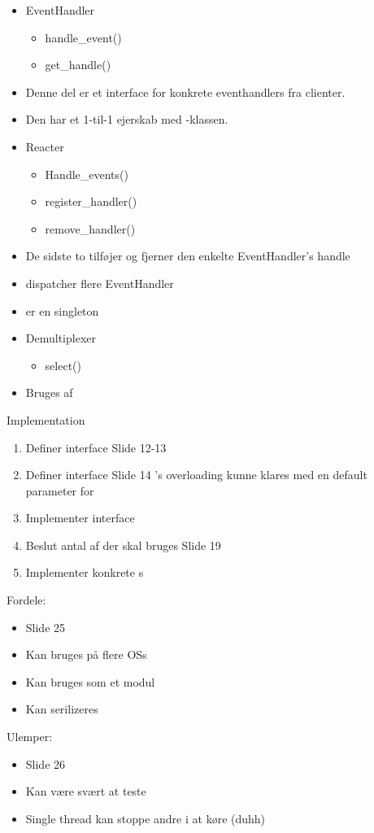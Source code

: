 \documentclass[oneside, 10pt]{memoir}
\begin{document}
\begin{itemize}
\item EventHandler
	\begin{itemize}
	\item handle\_event()
	\item get\_handle()
	\end{itemize}
\item[] Denne del er et interface for konkrete eventhandlers fra clienter.
\item[] Den har et 1-til-1 ejerskab med -klassen.

\item Reacter
	\begin{itemize}
	\item Handle\_events()
	\item register\_handler()
	\item remove\_handler()
	\end{itemize}
\item[] De sidste to tilføjer og fjerner den enkelte EventHandler's handle
\item[]  dispatcher flere EventHandler
\item[]  er en singleton

\item Demultiplexer
	\begin{itemize}
	\item select()
	\end{itemize}
\item[] Bruges af 
\end{itemize}
Implementation
\begin{enumerate}
\item Definer  interface
\subitem Slide 12-13
\item Definer  interface
\subitem Slide 14
\subitem {}'s overloading kunne klares med en default parameter for 
\item Implementer  interface
\item Beslut antal af  der skal bruges
\subitem Slide 19
\item Implementer konkrete s
\end{enumerate}
Fordele:

\begin{itemize}
\item Slide 25
\item Kan bruges på flere OSs
\item Kan bruges som et modul
\item Kan serilizeres
\end{itemize}
Ulemper:
\begin{itemize}
\item Slide 26
\item Kan være svært at teste
\item Single thread kan stoppe andre i at køre (duhh)
\end{itemize}
\end{document}
